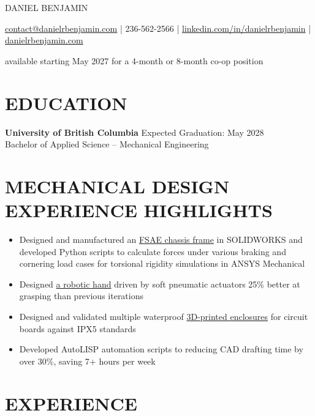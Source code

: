 \documentclass[11pt]{article}       %
\newcommand{\utmSource}{website}
\newcommand{\utmMedium}{resume}
\newcommand{\utmCampaign}{evergreen}
\newcommand{\utmContent}{general_resume}
\newcommand{\trackedPortfolioURL}[1]{%
  https://www.danielrbenjamin.com/#1?utm_source=\utmSource\&utm_medium=\utmMedium\&utm_campaign=\utmCampaign\&utm_content=\utmContent%
}
\newcommand{\portfolioLink}[2]{%
  \href{\trackedPortfolioURL{#1}}{#2}%
}
\begin{document}
\centerline{\Huge \color{accentColour} DANIEL BENJAMIN}

\vspace{5pt}

\centerline{\href{mailto:contact@danielrbenjamin.com}{contact@danielrbenjamin.com} | 236-562-2566 | \href{https://www.linkedin.com/in/danielrbenjamin}{linkedin.com/in/danielrbenjamin} | \portfolioLink{}{danielrbenjamin.com}}

\centerline{available starting May 2027 for a 4-month or 8-month co-op position}

\vspace{-6.5pt}

\section*{EDUCATION}
\textbf{University of British Columbia} \hfill Expected Graduation: May 2028
\\Bachelor of Applied Science – Mechanical Engineering

\vspace{-6.5pt}

\section*{MECHANICAL DESIGN EXPERIENCE HIGHLIGHTS}
\begin{itemize}
  \item Designed and manufactured an \portfolioLink{projects/fsae-chassis/}{FSAE chassis frame} in SOLIDWORKS and developed Python scripts to calculate forces under various braking and cornering load cases for torsional rigidity simulations in ANSYS Mechanical
  \item Designed \portfolioLink{projects/mems-hand/}{a robotic hand} driven by soft pneumatic actuators 25\% better at grasping than previous iterations
  \item Designed and validated multiple waterproof \portfolioLink{projects/circuit-enclosure/}{3D-printed enclosures} for circuit boards against IPX5 standards
  \item Developed AutoLISP automation scripts to  reducing CAD drafting time by over 30\%, saving 7+ hours per week
\end{itemize}

\section*{EXPERIENCE}
\end{document}
